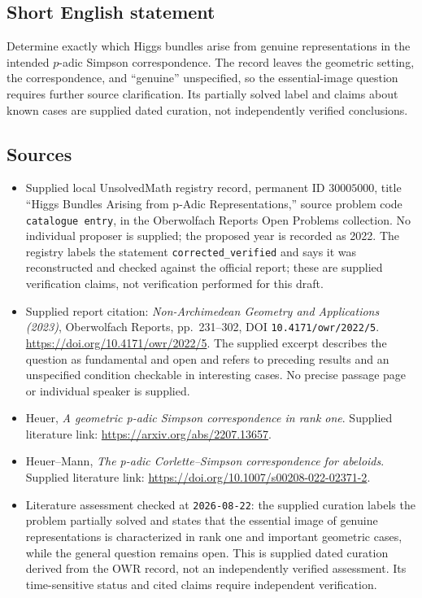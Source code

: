 \documentclass[11pt]{article}
\begin{document}
\subsection{Short English statement}
Determine exactly which Higgs bundles arise from genuine representations in the intended \(p\)-adic Simpson correspondence. The record leaves the geometric setting, the correspondence, and ``genuine'' unspecified, so the essential-image question requires further source clarification. Its partially solved label and claims about known cases are supplied dated curation, not independently verified conclusions.
\subsection{Sources}
\begin{itemize}
\item Supplied local UnsolvedMath registry record, permanent ID \(30005000\), title ``Higgs Bundles Arising from p-Adic Representations,'' source problem code \texttt{catalogue entry}, in the Oberwolfach Reports Open Problems collection. No individual proposer is supplied; the proposed year is recorded as 2022. The registry labels the statement \texttt{corrected\_verified} and says it was reconstructed and checked against the official report; these are supplied verification claims, not verification performed for this draft.
\item Supplied report citation: \emph{Non-Archimedean Geometry and Applications (2023)}, Oberwolfach Reports, pp.\ 231--302, DOI \texttt{10.4171/owr/2022/5}. \url{https://doi.org/10.4171/owr/2022/5}. The supplied excerpt describes the question as fundamental and open and refers to preceding results and an unspecified condition checkable in interesting cases. No precise passage page or individual speaker is supplied.
\item Heuer, \emph{A geometric p-adic Simpson correspondence in rank one}. Supplied literature link: \url{https://arxiv.org/abs/2207.13657}.
\item Heuer--Mann, \emph{The p-adic Corlette--Simpson correspondence for abeloids}. Supplied literature link: \url{https://doi.org/10.1007/s00208-022-02371-2}.
\item Literature assessment checked at \texttt{2026-08-22}: the supplied curation labels the problem partially solved and states that the essential image of genuine representations is characterized in rank one and important geometric cases, while the general question remains open. This is supplied dated curation derived from the OWR record, not an independently verified assessment. Its time-sensitive status and cited claims require independent verification.
\end{itemize}
\end{document}
